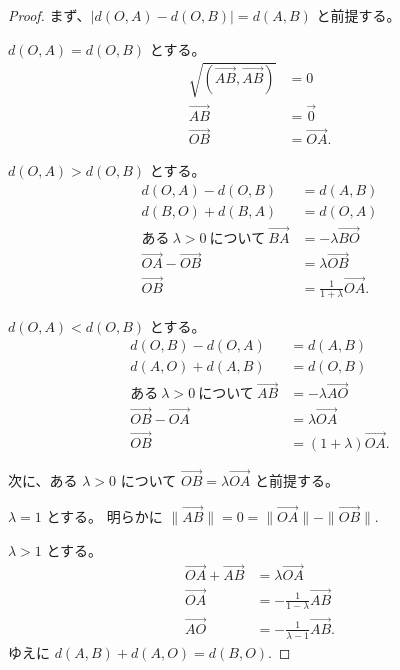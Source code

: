 \begin{proof}
  まず、\(|d(O,A)-d(O,B)|=d(A,B)\) と前提する。

  \(d(O,A)=d(O,B)\) とする。
  \begin{align*}
    \sqrt{(\overrightarrow{AB},\overrightarrow{AB})} &= 0 \\
                                 \overrightarrow{AB} &= \vec{0} \\
                                 \overrightarrow{OB} &= \overrightarrow{OA}.
  \end{align*}

  \(d(O,A)>d(O,B)\) とする。
  \begin{align*}
                                                 d(O,A)-d(O,B) &= d(A,B) \\
                                                 d(B,O)+d(B,A) &= d(O,A) \\
    \text{ある}\ \lambda>0\ \text{について}\ \overrightarrow{BA} &= -\lambda\overrightarrow{BO} \\
                       \overrightarrow{OA}-\overrightarrow{OB} &= \lambda\overrightarrow{OB} \\
                                           \overrightarrow{OB} &= \frac{1}{1+\lambda}\overrightarrow{OA}.
  \end{align*}

  \(d(O,A)<d(O,B)\) とする。
  \begin{align*}
                                                 d(O,B)-d(O,A) &= d(A,B) \\
                                                 d(A,O)+d(A,B) &= d(O,B) \\
    \text{ある}\ \lambda>0\ \text{について}\ \overrightarrow{AB} &= -\lambda\overrightarrow{AO} \\
                       \overrightarrow{OB}-\overrightarrow{OA} &= \lambda\overrightarrow{OA} \\
                                           \overrightarrow{OB} &= (1+\lambda)\overrightarrow{OA}.
  \end{align*}

  次に、ある \(\lambda>0\) について \(\overrightarrow{OB}=\lambda\overrightarrow{OA}\) と前提する。

  \(\lambda=1\) とする。
  明らかに \(\|\overrightarrow{AB}\|=0=\|\overrightarrow{OA}\|-\|\overrightarrow{OB}\|.\)

  \(\lambda>1\) とする。
  \begin{align*}
    \overrightarrow{OA}+\overrightarrow{AB} &= \lambda\overrightarrow{OA} \\
                        \overrightarrow{OA} &= -\frac{1}{1-\lambda}\overrightarrow{AB} \\
                        \overrightarrow{AO} &= -\frac{1}{\lambda-1}\overrightarrow{AB}.
  \end{align*}
  ゆえに \(d(A,B)+d(A,O)=d(B,O).\)


\end{proof}
